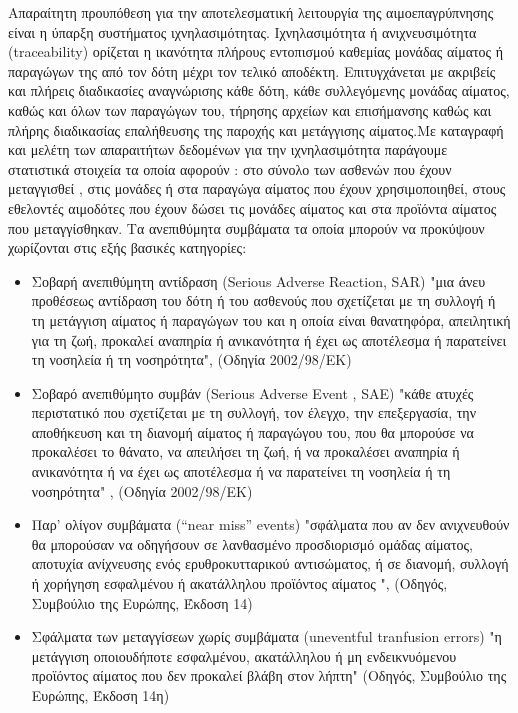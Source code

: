 	Απαραίτητη προυπόθεση για την αποτελεσματική λειτουργία της αιμοεπαγρύπνησης είναι η ύπαρξη συστήματος ιχνηλασιμότητας. Ιχνηλασιμότητα ή ανιχνευσιμότητα (traceability) ορίζεται η ικανότητα πλήρους εντοπισμού καθεμίας μονάδας αίματος ή παραγώγων της από τον δότη μέχρι τον τελικό αποδέκτη. Επιτυγχάνεται  με ακριβείς και πλήρεις διαδικασίες αναγνώρισης κάθε δότη, κάθε συλλεγόμενης μονάδας αίματος, καθώς και όλων των παραγώγων του, τήρησης αρχείων και επισήμανσης καθώς και πλήρης διαδικασίας επαλήθευσης της παροχής και μετάγγισης αίματος.Με καταγραφή και μελέτη των απαραιτήτων  δεδομένων για την ιχνηλασιμότητα παράγουμε στατιστικά στοιχεία τα οποία αφορούν : στο  σύνολο των ασθενών που έχουν μεταγγισθεί , στις μονάδες ή στα παραγώγα αίματος που έχουν χρησιμοποιηθεί, στους εθελοντές αιμοδότες που έχουν δώσει τις μονάδες αίματος και στα προϊόντα αίματος που μεταγγίσθηκαν. 
		Τα ανεπιθύμητα συμβάματα τα οποία μπορούν να προκύψουν χωρίζονται στις εξής βασικές κατηγορίες:
		\begin{itemize}
		\item	 Σοβαρή ανεπιθύμητη αντίδραση (Serious Adverse Reaction, SAR)
		 "μια άνευ προθέσεως αντίδραση του δότη ή του ασθενούς που σχετίζεται με τη συλλογή ή τη μετάγγιση αίματος ή παραγώγων του και η οποία είναι θανατηφόρα, απειλητική για τη ζωή, προκαλεί αναπηρία ή ανικανότητα ή έχει ως αποτέλεσμα ή παρατείνει τη νοσηλεία ή τη νοσηρότητα", (Οδηγία 2002/98/ΕΚ)
 		\item Σοβαρό ανεπιθύμητο συμβάν (Serious Adverse Event , SAE)
 		"κάθε ατυχές περιστατικό που σχετίζεται με τη συλλογή, τον έλεγχο, την επεξεργασία, την αποθήκευση και τη διανομή αίματος ή παραγώγου του, που θα μπορούσε να προκαλέσει το θάνατο, να απειλήσει τη ζωή, ή να προκαλέσει αναπηρία ή ανικανότητα ή να έχει ως αποτέλεσμα ή να παρατείνει τη νοσηλεία ή τη νοσηρότητα" , (Οδηγία 2002/98/ΕΚ)
 		\item Παρ’ ολίγον συμβάματα (“near miss” events)
 		 "σφάλματα που αν δεν ανιχνευθούν θα μπορούσαν να οδηγήσουν σε λανθασμένο προσδιορισμό ομάδας αίματος, αποτυχία ανίχνευσης ενός ερυθροκυτταρικού αντισώματος, ή σε διανομή, συλλογή ή χορήγηση εσφαλμένου ή ακατάλληλου προϊόντος αίματος ", (Οδηγός, Συμβούλιο της Ευρώπης, Έκδοση 14) 
 		 \item Σφάλματα των μεταγγίσεων χωρίς συμβάματα (uneventful tranfusion errors)
 		 "η μετάγγιση οποιουδήποτε εσφαλμένου, ακατάλληλου ή μη ενδεικνυόμενου προϊόντος αίματος που δεν προκαλεί βλάβη στον λήπτη" (Οδηγός, Συμβούλιο της Ευρώπης, Έκδοση 14η)
 		 \end{itemize} 
 		 
